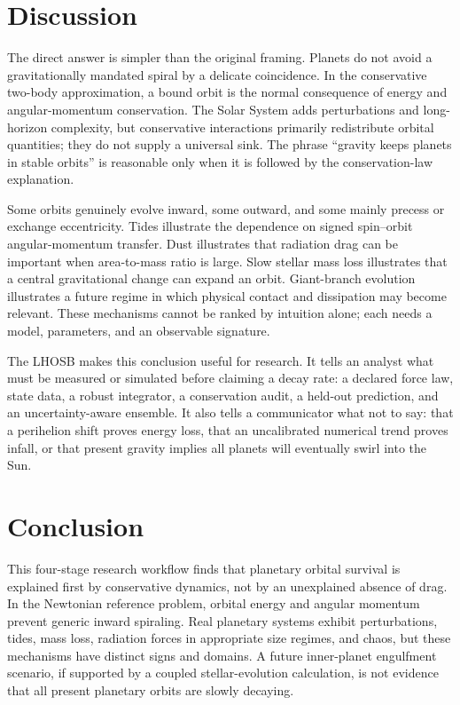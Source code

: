 \documentclass[10pt,conference]{IEEEtran}
\begin{document}
\section{Discussion}
\label{sec:discussion}

The direct answer is simpler than the original framing. Planets do not avoid a gravitationally mandated spiral by a delicate coincidence. In the conservative two-body approximation, a bound orbit is the normal consequence of energy and angular-momentum conservation. The Solar System adds perturbations and long-horizon complexity, but conservative interactions primarily redistribute orbital quantities; they do not supply a universal sink. The phrase ``gravity keeps planets in stable orbits'' is reasonable only when it is followed by the conservation-law explanation.

Some orbits genuinely evolve inward, some outward, and some mainly precess or exchange eccentricity. Tides illustrate the dependence on signed spin--orbit angular-momentum transfer. Dust illustrates that radiation drag can be important when area-to-mass ratio is large. Slow stellar mass loss illustrates that a central gravitational change can expand an orbit. Giant-branch evolution illustrates a future regime in which physical contact and dissipation may become relevant. These mechanisms cannot be ranked by intuition alone; each needs a model, parameters, and an observable signature.

The LHOSB makes this conclusion useful for research. It tells an analyst what must be measured or simulated before claiming a decay rate: a declared force law, state data, a robust integrator, a conservation audit, a held-out prediction, and an uncertainty-aware ensemble. It also tells a communicator what not to say: that a perihelion shift proves energy loss, that an uncalibrated numerical trend proves infall, or that present gravity implies all planets will eventually swirl into the Sun.

\section{Conclusion}
\label{sec:conclusion}

This four-stage research workflow finds that planetary orbital survival is explained first by conservative dynamics, not by an unexplained absence of drag. In the Newtonian reference problem, orbital energy and angular momentum prevent generic inward spiraling. Real planetary systems exhibit perturbations, tides, mass loss, radiation forces in appropriate size regimes, and chaos, but these mechanisms have distinct signs and domains. A future inner-planet engulfment scenario, if supported by a coupled stellar-evolution calculation, is not evidence that all present planetary orbits are slowly decaying.
\end{document}
